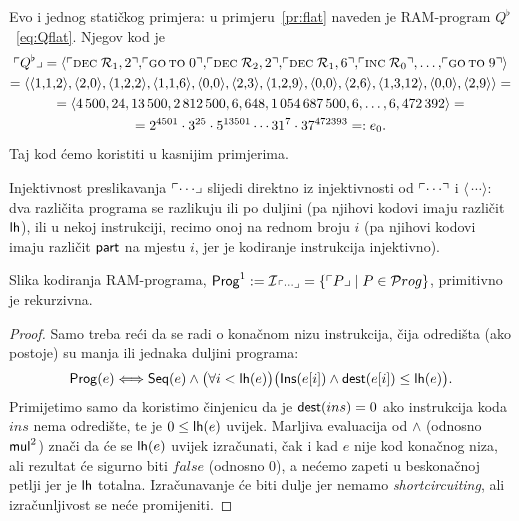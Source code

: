\begin{primjer}\label{pr:Qflatkod}
Evo i jednog statičkog primjera: u primjeru~\ref{pr:flat} naveden je RAM-program $Q^\flat$~\eqref{eq:Qflat}. Njegov kod je
\begin{multline}
    \kprog{Q^\flat}=\langle\kins{\decr12},\!\kins{\goto\;0},\!\kins{\decr22},\!\kins{\decr16},\!\kins{\incr0},\dotsc,\!\kins{\goto\;9}\rangle\\
    =\langle\langle1,\!1,\!2\rangle,\langle2,\!0\rangle,\langle1,\!2,\!2\rangle,\langle1,\!1,\!6\rangle,\langle0,\!0\rangle,\langle2,\!3\rangle,\langle1,\!2,\!9\rangle,\langle0,\!0\rangle,\langle2,\!6\rangle,\langle1,\!3,\!12\rangle,\langle0,\!0\rangle,\langle2,\!9\rangle\rangle=\\
    =\langle4\,500,24,13\,500,2\,812\,500,6,648,1\,054\,687\,500,6,\dotsc,6,472\,392\rangle=\\
    =2^{4501}\cdot3^{25}\cdot5^{13501}\dotsm31^7\cdot37^{472393}=:e_0\text.
\end{multline}
Taj kod ćemo koristiti u kasnijim primjerima.
\end{primjer}

Injektivnost preslikavanja $\ulcorner\cdots\lrcorner$ slijedi direktno iz injektivnosti od $\ulcorner\cdots\urcorner$ i $\langle\,\cdots\rangle$: dva različita programa se razlikuju ili po duljini (pa njihovi kodovi imaju različit $\mathsf{lh}$), ili u nekoj instrukciji, recimo onoj na rednom broju $i$ (pa njihovi kodovi imaju različit $\mathsf{part}$ na mjestu $i$, jer je kodiranje instrukcija injektivno).

\begin{lema}
    Slika kodiranja RAM-programa, $\mathsf{Prog}^1:=\mathcal I_{\,\ulcorner\cdots\lrcorner}=\{\ulcorner P\lrcorner\mid P\in\mathcal Prog\}$, primitivno je rekurzivna.
\end{lema}
\begin{proof}
Samo treba reći da se radi o konačnom nizu instrukcija, čija odredišta (ako postoje) su manja ili jednaka duljini programa:
\begin{equation}\label{eq:Progget}
    \mathsf{Prog}(e)\Longleftrightarrow\mathsf{Seq}(e)\wedge\bigl(\forall i<\mathsf{lh}(e)\bigr)\bigl(\mathsf{Ins}(e[i])\land\mathsf{dest}(e[i])\le \mathsf{lh}(e)\bigr)\text.\\
\end{equation}
Primijetimo samo da koristimo činjenicu da je $\mathsf{dest}(ins)=0$ ako instrukcija koda $ins$ nema od\-re\-di\-šte, te je $0\le\mathsf{lh}(e)$ uvijek. Marljiva evaluacija od $\land$ (odnosno $\mathsf{mul}^2$) znači da će se $\mathsf{lh}(e)$ uvijek izračunati, čak i kad $e$ nije kod konačnog niza, ali rezultat će sigurno biti $\mathit{false}$ (odnosno $0$), a nećemo zapeti u beskonačnoj petlji jer je $\mathsf{lh}$ totalna. Izračunavanje će biti dulje jer nemamo \emph{shortcircuiting}, ali izračunljivost se neće promijeniti.
\end{proof}

